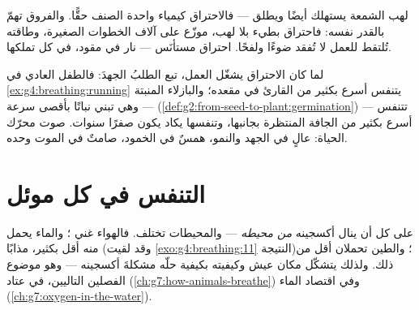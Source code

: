 \begin{example}\label{ex:g7:what-is-respiration:fire}
لهب الشمعة يستهلك أيضًا  ويطلق  ---
فالاحتراق  كيمياء واحدة الصنف حقًّا. والفروق تهمّ بالقدر
نفسه: فاحتراق  بطيء بلا لهب، موزّع على آلاف الخطوات الصغيرة،
وطاقته تُلتقط للعمل لا تُفقد ضوءًا ولفحًا.  احتراق مستأنَس
--- نار في مقود، في كل  تملكها.
\end{example}

\begin{example}\label{ex:g7:what-is-respiration:demand}
لما كان الاحتراق يشغّل العمل، تبع الطلبُ الجهدَ: فالطفل العادي في
\cref{ex:g4:breathing:running} يتنفس أسرع بكثير من القارئ في
مقعده؛ والبازلاء المنبتة --- وهي تبني نباتًا بأقصى سرعة
(\cref{def:g2:from-seed-to-plant:germination}) --- تتنفس أسرع
بكثير من  الجافة المنتظرة بجانبها، وتنفسها يكاد يكون صفرًا
سنوات.  صوت محرّك الحياة: عالٍ في الجهد والنمو، همسٌ في
الخمود، صامتٌ في الموت وحده.
\end{example}

\section{التنفس في كل موئل}

\begin{proposition}\label{prop:g7:what-is-respiration:habitats}
على كل  أن ينال أكسجينه \emph{من محيطه} --- والمحيطات
تختلف. فالهواء غني ؛ والماء يحمل منه أقل بكثير، مذابًا
(وقد لقيت \cref{exo:g4:breathing:11} النتيجة)؛  والطين
تحملان أقل من ذلك. ولذلك يتشكّل مكان عيش  وكيفيته بكيفية
حلّه مشكلةَ أكسجينه --- وهو موضوع الفصلين التاليين، في عتاد
 (\cref{ch:g7:how-animals-breathe}) وفي اقتصاد الماء
(\cref{ch:g7:oxygen-in-the-water}).
\end{proposition}
\admitted

